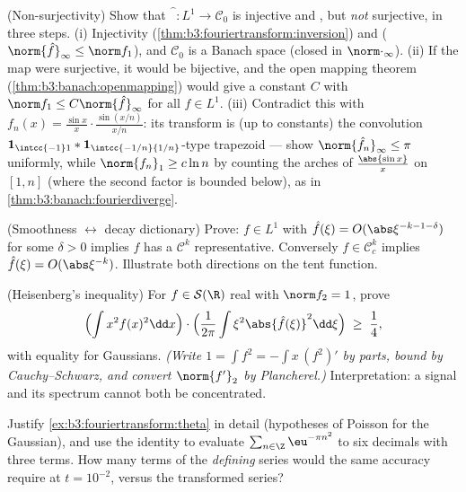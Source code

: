 \begin{exercise}[$\star\star\star$]\label{exo:b3:fouriertransform:6}
(Non-surjectivity) Show that $\widehat{\phantom f}\colon L^1
\to \mathcal C_0$ is injective and , but \emph{not}
surjective, in three steps.
(i) Injectivity (\cref{thm:b3:fouriertransform:inversion}) and
 ($\norm{\hat f}_\infty \leq \norm f_1$), and
$\mathcal C_0$ is a Banach space (closed in
$\norm\cdot_\infty$).
(ii) If the map were surjective, it would be bijective, and
the open mapping theorem (\cref{thm:b3:banach:openmapping})
would give a constant $C$ with $\norm f_1 \leq C\norm{\hat
f}_\infty$ for all $f \in L^1$.
(iii) Contradict this with $f_n(x) = \frac{\sin
x}{x}\cdot\frac{\sin(x/n)}{x/n}$: its transform is (up to
constants) the convolution $\mathbf 1_{\intcc{-1}1} *
\mathbf 1_{\intcc{-1/n}{1/n}}$-type trapezoid --- show
$\norm{\hat f_n}_\infty \leq \pi$ uniformly, while
$\norm{f_n}_1 \geq c\ln n$ by counting the arches of
$\frac{\abs{\sin x}}x$ on $[1, n]$ (where the second factor is
bounded below), as in \cref{thm:b3:banach:fourierdiverge}.
\end{exercise}

\begin{exercise}[$\star\star$]\label{exo:b3:fouriertransform:7}
(Smoothness $\leftrightarrow$ decay dictionary) Prove: $f \in
L^1$ with $\hat f(\xi) = O(\abs\xi^{-k-1-\delta})$ for some
$\delta > 0$ implies $f$ has a $\mathcal C^k$ representative.
Conversely $f \in \mathcal C^k_c$ implies $\hat f(\xi) =
O(\abs\xi^{-k})$. Illustrate both directions on the tent
function.
\end{exercise}

\begin{exercise}[$\star\star\star$]\label{exo:b3:fouriertransform:8}
(Heisenberg's inequality) For $f \in \mathcal S(\R)$ real with
$\norm f_2 = 1$, prove
\[
\Bigl(\int x^2f(x)^2\dd x\Bigr)\cdot
\Bigl(\frac1{2\pi}\int \xi^2\abs{\hat f(\xi)}^2\dd\xi\Bigr)
\;\geq\; \frac14 ,
\]
with equality for Gaussians. \emph{(Write $1 = \int f^2 =
-\int x\,(f^2)'$ by parts, bound by Cauchy--Schwarz, and
convert $\norm{f'}_2$ by Plancherel.)} Interpretation: a
signal and its spectrum cannot both be concentrated.
\end{exercise}

\begin{exercise}[$\star\star$]\label{exo:b3:fouriertransform:9}
Justify \cref{ex:b3:fouriertransform:theta} in detail
(hypotheses of Poisson for the Gaussian), and use the identity
to evaluate $\sum_{n\in\Z}\eu^{-\pi n^2}$ to six decimals with
three terms. How many terms of the \emph{defining} series
would the same accuracy require at $t = 10^{-2}$, versus the
transformed series?
\end{exercise}

